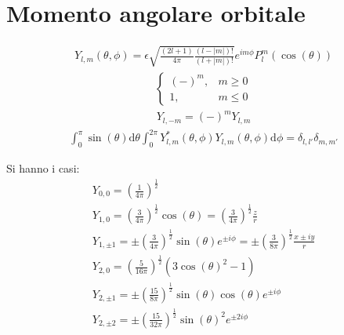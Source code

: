 \section{Momento angolare orbitale} %
\begin{equation}\begin{split}
Y_{l,m}\left(\theta,\phi\right)=\epsilon\sqrt{\frac{\left(2l+1\right)}{4\pi}\frac{\left(l-|m|\right)!}{\left(l+|m|\right)!}}e^{im\phi}P^m_l\left(\cos{\left(\theta\right)}\right)
\end{split}\end{equation}
\begin{equation}\begin{split}
\begin{cases}
\left(-\right)^m, & m\ge 0 \\
1, & m\le 0
\end{cases}
\end{split}\end{equation}
\begin{equation}\begin{split}
Y_{l,-m}=\left(-\right)^mY_{l,m}
\end{split}\end{equation}
\begin{equation}\begin{split}
\int_{0}^{\pi}{\sin{\left(\theta\right)} \textrm{d}\theta}\int_{0}^{2\pi}{Y_{l,m}^*\left(\theta,\phi\right)Y_{l,m}\left(\theta,\phi\right)\textrm{d}\phi}=\delta_{l,l'}\delta_{m,m'}
\end{split}\end{equation}

Si hanno i casi:
\begin{equation}\begin{split}
Y_{0,0}=\left(\frac{1}{4\pi}\right)^{\frac{1}{2}} \\
Y_{1,0}=\left(\frac{3}{4\pi}\right)^{\frac{1}{2}}\cos{\left(\theta\right)} =\left(\frac{3}{4\pi}\right)^{\frac{1}{2}}\frac{z}{r} \\
Y_{1,\pm 1}=\pm\left(\frac{3}{4\pi}\right)^{\frac{1}{2}}\sin{\left(\theta\right)}e^{\pm i\phi} =\pm\left(\frac{3}{8\pi}\right)^{\frac{1}{2}}\frac{x\pm iy}{r} \\
Y_{2,0}=\left(\frac{5}{16\pi}\right)^{\frac{1}{2}}\left(3\cos{\left(\theta\right)}^2-1\right) \\
Y_{2,\pm 1}=\pm\left(\frac{15}{8\pi}\right)^{\frac{1}{2}}\sin{\left(\theta\right)}\cos{\left(\theta\right)}e^{\pm i\phi} \\
Y_{2,\pm 2}=\pm\left(\frac{15}{32\pi}\right)^{\frac{1}{2}}\sin{\left(\theta\right)}^2e^{\pm 2i\phi} \\
\end{split}\end{equation}

